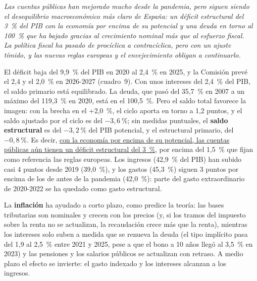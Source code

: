 \begin{examen}
\textit{Las cuentas públicas han mejorado mucho desde la pandemia, pero siguen siendo el desequilibrio macroeconómico más claro de España: un déficit estructural del 3~\% del PIB con la economía por encima de su potencial y una deuda en torno al 100~\% que ha bajado gracias al crecimiento nominal más que al esfuerzo fiscal. La política fiscal ha pasado de procíclica a contracíclica, pero con un ajuste tímido, y las nuevas reglas europeas y el envejecimiento obligan a continuarlo.}

El déficit baja del 9,9~\% del PIB en 2020 al 2,4~\% en 2025, y la Comisión prevé el 2,4 y el 2,0~\% en 2026-2027 (cuadro~9). Con unos intereses del 2,4~\% del PIB, el saldo primario está equilibrado. La deuda, que pasó del 35,7~\% en 2007 a un máximo del 119,3~\% en 2020, está en el 100,5~\%. Pero el saldo total favorece la imagen: con la brecha en el +2,0~\%, el ciclo aporta en torno a 1,2 puntos, y el saldo ajustado por el ciclo es del $-3{,}6~\%$; sin medidas puntuales, el \textbf{saldo estructural} es del $-3{,}2~\%$ del PIB potencial, y el estructural primario, del $-0{,}8~\%$. Es decir, \uline{con la economía por encima de su potencial, las cuentas públicas aún tienen un déficit estructural del 3~\%}, por encima del 1,5~\% que fijan como referencia las reglas europeas. Los ingresos (42,9~\% del PIB) han subido casi 4 puntos desde 2019 (39,0~\%), y los gastos (45,3~\%) siguen 3 puntos por encima de los de antes de la pandemia (42,0~\%): parte del gasto extraordinario de 2020-2022 se ha quedado como gasto estructural.

La \textbf{inflación} ha ayudado a corto plazo, como predice la teoría: las bases tributarias son nominales y crecen con los precios (y, si los tramos del impuesto sobre la renta no se actualizan, la recaudación crece más que la renta), mientras los intereses solo suben a medida que se renueva la deuda (el tipo implícito pasa del 1,9 al 2,5~\% entre 2021 y 2025, pese a que el bono a 10 años llegó al 3,5~\% en 2023) y las pensiones y los salarios públicos se actualizan con retraso. A medio plazo el efecto se invierte: el gasto indexado y los intereses alcanzan a los ingresos.


\end{examen}
